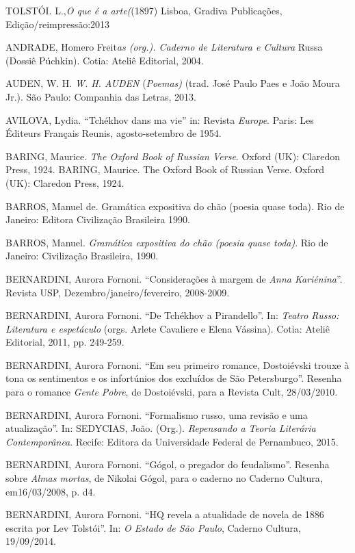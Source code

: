 {TOLSTÓI. L.,\emph{O que é a arte(}(1897) Lisboa, Gradiva Publicações,
Edição/reimpressão:2013


ANDRADE, Homero Freit\emph{as (org.). Caderno de Literatura e Cultura}
Russa (Dossiê Púchkin). Cotia: Ateliê Editorial, 2004.

AUDEN, W. H. \emph{W. H. AUDEN} (\emph{Poemas)} (trad. José Paulo Paes e
João Moura Jr.). São Paulo: Companhia das Letras, 2013.

AVILOVA, Lydia. ``Tchékhov dans ma vie'' in: Revista \emph{Europe}.
Paris: Les Éditeurs Français Reunis, agosto-setembro de 1954.

BARING, Maurice. \emph{The Oxford Book of
Russian Verse}. Oxford (UK): Claredon Press,
1924. BARING, Maurice. The Oxford Book of Russian Verse. Oxford (UK): Claredon Press, 1924.\label{baring-maurice.-the-oxford-book-of-russian-verse.-oxford-uk-claredon-press-1924.}

BARROS, Manuel de. Gramática expositiva do chão (poesia quase toda). Rio
de Janeiro: Editora Civilização Brasileira 1990.

BARROS, Manuel. \emph{Gramática expositiva do chão (poesia quase toda)}.
Rio de Janeiro: Civilização Brasileira, 1990.

BERNARDINI, Aurora Fornoni. ``Considerações à margem de \emph{Anna
Kariénina}''. Revista USP, Dezembro/janeiro/fevereiro, 2008-2009.

BERNARDINI, Aurora Fornoni. ``De Tchékhov a Pirandello''. In:
\emph{Teatro Russo: Literatura e espetáculo} (orgs. Arlete Cavaliere e
Elena Vássina). Cotia: Ateliê Editorial, 2011, pp. 249-259.

BERNARDINI, Aurora Fornoni. ``Em seu primeiro romance, Dostoiévski
trouxe à tona os sentimentos e os infortúnios dos excluídos de São
Petersburgo''. Resenha para o romance \emph{Gente Pobre}, de
Dostoiévski, para a Revista Cult, 28/03/2010.

BERNARDINI, Aurora Fornoni. ``Formalismo russo, uma revisão e uma
atualização''. In: SEDYCIAS, João. (Org.). \emph{Repensando a Teoria
Literária Contemporânea}. Recife: Editora da Universidade Federal de
Pernambuco, 2015.

BERNARDINI, Aurora Fornoni. ``Gógol, o pregador do feudalismo''. Resenha
sobre \emph{Almas mortas}, de Nikolai Gógol, para o caderno no Caderno
Cultura, em16/03/2008, p. d4.

BERNARDINI, Aurora Fornoni. ``HQ revela a atualidade de novela de 1886
escrita por Lev Tolstói''. In: \emph{O Estado de São Paulo}, Caderno
Cultura, 19/09/2014.

}
